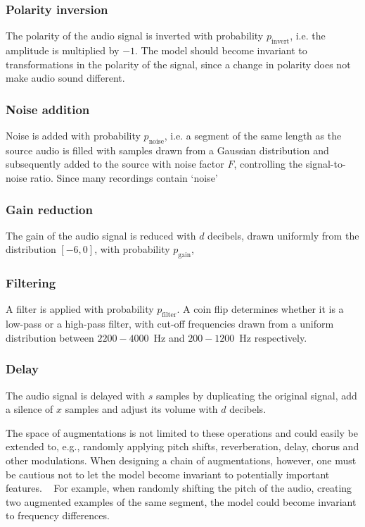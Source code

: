 \documentclass{report}
\DeclareRobustCommand{\diffword}[1]{{\sethlcolor{orange}\hl{#1}}}
\begin{document}
\subsubsection*{Polarity inversion}
The polarity of the audio signal is inverted with probability $p_{\mathrm{invert}}$, i.e. the amplitude is multiplied by $-1$. The model should become invariant to transformations in the polarity of the signal, since a change in polarity does not make audio sound different.

\subsubsection*{Noise addition}
Noise is added with probability $p_{\mathrm{noise}}$, i.e. a segment of the same length as the source audio is filled with samples drawn from a Gaussian distribution and subsequently added to the source with noise factor $F$, controlling the signal-to-noise ratio. Since many recordings contain `noise'

\subsubsection*{Gain reduction}
The gain of the audio signal is reduced with $d$ decibels, drawn uniformly from the distribution $[-6, 0]$, with probability $p_{\mathrm{gain}}$, 

\subsubsection*{Filtering}
A filter is applied with probability $p_{\mathrm{filter}}$. A coin flip determines whether it is a low-pass or a high-pass filter, with cut-off frequencies drawn from a uniform distribution between $2200-4000$~Hz and $200-1200$~Hz respectively.

\subsubsection*{Delay}
The audio signal is delayed with $s$ samples by duplicating the original signal, add a silence of $x$ samples and adjust its volume with $d$ decibels.


The space of augmentations is not limited to these operations and could easily be extended to, e.g., randomly applying pitch shifts, reverberation, delay, chorus and other modulations. When designing a chain of augmentations, however, one must be cautious not to let the model become invariant to potentially important features. \
For example, when randomly shifting the pitch of the audio, creating two augmented examples of the same segment, 
the model could become invariant to frequency differences.
\end{document}
